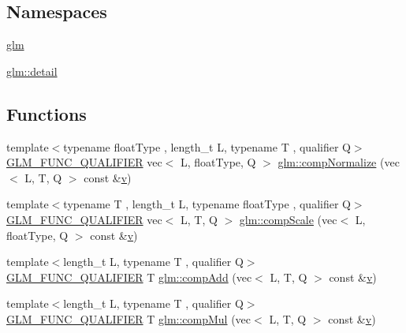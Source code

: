 \subsection*{Namespaces}
\begin{DoxyCompactItemize}
\item 
 \mbox{\hyperlink{namespaceglm}{glm}}
\item 
 \mbox{\hyperlink{namespaceglm_1_1detail}{glm\+::detail}}
\end{DoxyCompactItemize}
\subsection*{Functions}
\begin{DoxyCompactItemize}
\item 
{\footnotesize template$<$typename float\+Type , length\+\_\+t L, typename T , qualifier Q$>$ }\\\mbox{\hyperlink{setup_8hpp_a33fdea6f91c5f834105f7415e2a64407}{G\+L\+M\+\_\+\+F\+U\+N\+C\+\_\+\+Q\+U\+A\+L\+I\+F\+I\+ER}} vec$<$ L, float\+Type, Q $>$ \mbox{\hyperlink{group__gtx__component__wise_ga8f2b81ada8515875e58cb1667b6b9908}{glm\+::comp\+Normalize}} (vec$<$ L, T, Q $>$ const \&\mbox{\hyperlink{_s_d_l__opengl_8h_a10a82eabcb59d2fcd74acee063775f90}{v}})
\item 
{\footnotesize template$<$typename T , length\+\_\+t L, typename float\+Type , qualifier Q$>$ }\\\mbox{\hyperlink{setup_8hpp_a33fdea6f91c5f834105f7415e2a64407}{G\+L\+M\+\_\+\+F\+U\+N\+C\+\_\+\+Q\+U\+A\+L\+I\+F\+I\+ER}} vec$<$ L, T, Q $>$ \mbox{\hyperlink{group__gtx__component__wise_ga80abc2980d65d675f435d178c36880eb}{glm\+::comp\+Scale}} (vec$<$ L, float\+Type, Q $>$ const \&\mbox{\hyperlink{_s_d_l__opengl_8h_a10a82eabcb59d2fcd74acee063775f90}{v}})
\item 
{\footnotesize template$<$length\+\_\+t L, typename T , qualifier Q$>$ }\\\mbox{\hyperlink{setup_8hpp_a33fdea6f91c5f834105f7415e2a64407}{G\+L\+M\+\_\+\+F\+U\+N\+C\+\_\+\+Q\+U\+A\+L\+I\+F\+I\+ER}} T \mbox{\hyperlink{namespaceglm_ad69e502a1932680c5b2767998e2434d7}{glm\+::comp\+Add}} (vec$<$ L, T, Q $>$ const \&\mbox{\hyperlink{_s_d_l__opengl_8h_a10a82eabcb59d2fcd74acee063775f90}{v}})
\item 
{\footnotesize template$<$length\+\_\+t L, typename T , qualifier Q$>$ }\\\mbox{\hyperlink{setup_8hpp_a33fdea6f91c5f834105f7415e2a64407}{G\+L\+M\+\_\+\+F\+U\+N\+C\+\_\+\+Q\+U\+A\+L\+I\+F\+I\+ER}} T \mbox{\hyperlink{namespaceglm_aa5abf1348de4c38ac2d81be2e0f4798e}{glm\+::comp\+Mul}} (vec$<$ L, T, Q $>$ const \&\mbox{\hyperlink{_s_d_l__opengl_8h_a10a82eabcb59d2fcd74acee063775f90}{v}})

\end{DoxyCompactItemize}
